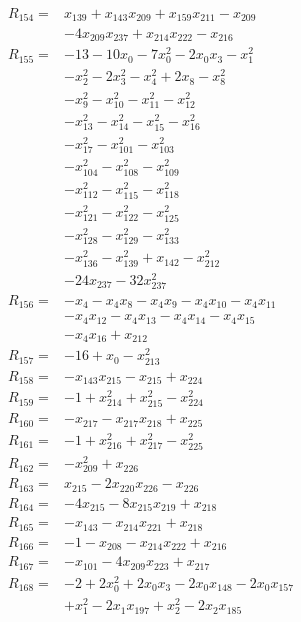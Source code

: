 \begin{align*}
R_{154}={}&x_{139} +x_{143}x_{209} +x_{159}x_{211} -x_{209}\\
&-4x_{209}x_{237} +x_{214}x_{222} -x_{216}\\[3pt]
R_{155}={}&-13 -10x_{0} -7x_{0}^{2} -2x_{0}x_{3} -x_{1}^{2}\\
&-x_{2}^{2} -2x_{3}^{2} -x_{4}^{2} +2x_{8} -x_{8}^{2}\\
&-x_{9}^{2} -x_{10}^{2} -x_{11}^{2} -x_{12}^{2}\\
&-x_{13}^{2} -x_{14}^{2} -x_{15}^{2} -x_{16}^{2}\\
&-x_{17}^{2} -x_{101}^{2} -x_{103}^{2}\\
&-x_{104}^{2} -x_{108}^{2} -x_{109}^{2}\\
&-x_{112}^{2} -x_{115}^{2} -x_{118}^{2}\\
&-x_{121}^{2} -x_{122}^{2} -x_{125}^{2}\\
&-x_{128}^{2} -x_{129}^{2} -x_{133}^{2}\\
&-x_{136}^{2} -x_{139}^{2} +x_{142} -x_{212}^{2}\\
&-24x_{237} -32x_{237}^{2}\\[3pt]
R_{156}={}&-x_{4} -x_{4}x_{8} -x_{4}x_{9} -x_{4}x_{10} -x_{4}x_{11}\\
&-x_{4}x_{12} -x_{4}x_{13} -x_{4}x_{14} -x_{4}x_{15}\\
&-x_{4}x_{16} +x_{212}\\[3pt]
R_{157}={}&-16 +x_{0} -x_{213}^{2}\\[3pt]
R_{158}={}&-x_{143}x_{215} -x_{215} +x_{224}\\[3pt]
R_{159}={}&-1 +x_{214}^{2} +x_{215}^{2} -x_{224}^{2}\\[3pt]
R_{160}={}&-x_{217} -x_{217}x_{218} +x_{225}\\[3pt]
R_{161}={}&-1 +x_{216}^{2} +x_{217}^{2} -x_{225}^{2}\\[3pt]
R_{162}={}&-x_{209}^{2} +x_{226}\\[3pt]
R_{163}={}&x_{215} -2x_{220}x_{226} -x_{226}\\[3pt]
R_{164}={}&-4x_{215} -8x_{215}x_{219} +x_{218}\\[3pt]
R_{165}={}&-x_{143} -x_{214}x_{221} +x_{218}\\[3pt]
R_{166}={}&-1 -x_{208} -x_{214}x_{222} +x_{216}\\[3pt]
R_{167}={}&-x_{101} -4x_{209}x_{223} +x_{217}\\[3pt]
R_{168}={}&-2 +2x_{0}^{2} +2x_{0}x_{3} -2x_{0}x_{148} -2x_{0}x_{157}\\
&+x_{1}^{2} -2x_{1}x_{197} +x_{2}^{2} -2x_{2}x_{185}\\

\end{align*}
